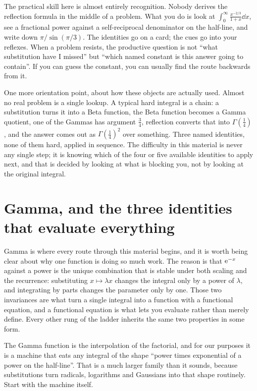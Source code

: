 \begin{keynote}
The practical skill here is almost entirely recognition. Nobody derives the reflection formula in the middle of a problem. What you do is look at $\int_0^{\infty}\frac{x^{-2/3}}{1+x}\dd x$, see a fractional power against a self-reciprocal denominator on the half-line, and write down $\pi/\sin(\pi/3)$. The identities go on a card; the cues go into your reflexes. When a problem resists, the productive question is not ``what substitution have I missed'' but ``which named constant is this answer going to contain''. If you can guess the constant, you can usually find the route backwards from it.
\end{keynote}

One more orientation point, about how these objects are actually used. Almost no real problem is a single lookup. A typical hard integral is a chain: a substitution turns it into a Beta function, the Beta function becomes a Gamma quotient, one of the Gammas has argument $\tfrac34$, reflection converts that into $\Gamma(\tfrac14)$, and the answer comes out as $\Gamma(\tfrac14)^{2}$ over something. Three named identities, none of them hard, applied in sequence. The difficulty in this material is never any single step; it is knowing which of the four or five available identities to apply next, and that is decided by looking at what is blocking you, not by looking at the original integral.

\section{Gamma, and the three identities that evaluate everything}

Gamma is where every route through this material begins, and it is worth being clear about why one function is doing so much work. The reason is that $\mathrm{e}^{-x}$ against a power is the unique combination that is stable under both scaling and the recurrence: substituting $x\mapsto\lambda x$ changes the integral only by a power of $\lambda$, and integrating by parts changes the parameter only by one. Those two invariances are what turn a single integral into a function with a functional equation, and a functional equation is what lets you evaluate rather than merely define. Every other rung of the ladder inherits the same two properties in some form.

The Gamma function is the interpolation of the factorial, and for our purposes it is a machine that eats any integral of the shape ``power times exponential of a power on the half-line''. That is a much larger family than it sounds, because substitutions turn radicals, logarithms and Gaussians into that shape routinely. Start with the machine itself.

